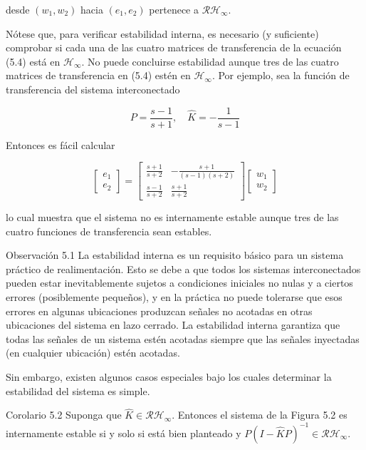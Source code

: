 desde $\left(w_{1}, w_{2}\right)$ hacia $\left(e_{1}, e_{2}\right)$ pertenece a $\mathcal{R} \mathcal{H}_{\infty}$.

Nótese que, para verificar estabilidad interna, es necesario (y suficiente) comprobar si cada una de las cuatro matrices de transferencia de la ecuación (5.4) está en $\mathcal{H}_{\infty}$. No puede concluirse estabilidad aunque tres de las cuatro matrices de transferencia en (5.4) estén en $\mathcal{H}_{\infty}$. Por ejemplo, sea la función de transferencia del sistema interconectado

$$
P=\frac{s-1}{s+1}, \quad \hat{K}=-\frac{1}{s-1}
$$

Entonces es fácil calcular

$$
\left[\begin{array}{l}
e_{1} \\
e_{2}
\end{array}\right]=\left[\begin{array}{cc}
\frac{s+1}{s+2} & -\frac{s+1}{(s-1)(s+2)} \\
\frac{s-1}{s+2} & \frac{s+1}{s+2}
\end{array}\right]\left[\begin{array}{l}
w_{1} \\
w_{2}
\end{array}\right]
$$

lo cual muestra que el sistema no es internamente estable aunque tres de las cuatro funciones de transferencia sean estables.

Observación 5.1 La estabilidad interna es un requisito básico para un sistema práctico de realimentación. Esto se debe a que todos los sistemas interconectados pueden estar inevitablemente sujetos a condiciones iniciales no nulas y a ciertos errores (posiblemente pequeños), y en la práctica no puede tolerarse que esos errores en algunas ubicaciones produzcan señales no acotadas en otras ubicaciones del sistema en lazo cerrado. La estabilidad interna garantiza que todas las señales de un sistema estén acotadas siempre que las señales inyectadas (en cualquier ubicación) estén acotadas.

Sin embargo, existen algunos casos especiales bajo los cuales determinar la estabilidad del sistema es simple.

Corolario 5.2 Suponga que $\hat{K} \in \mathcal{R H}_{\infty}$. Entonces el sistema de la Figura 5.2 es internamente estable si y solo si está bien planteado y $P(I-\hat{K} P)^{-1} \in \mathcal{R} \mathcal{H}_{\infty}$.

